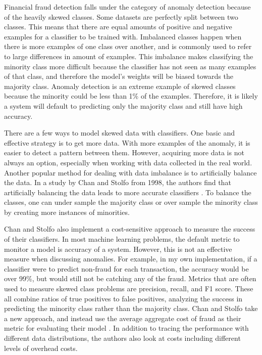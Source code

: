 \documentclass[midd]{thesis}
\begin{document}
Financial fraud detection falls under the category of anomaly detection because of the heavily skewed classes. Some datasets are perfectly split between two classes. This means that there are equal amounts of positive and negative examples for a classifier to be trained with. Imbalanced classes happen when there is more examples of one class over another, and is commonly used to refer to large differences in amount of examples. This imbalance makes classifying the minority class more difficult because the classifier has not seen as many examples of that class, and therefore the model's weights will be biased towards the majority class. Anomaly detection is an extreme example of skewed classes because the minority could be less than 1\% of the examples. Therefore, it is likely a system will default to predicting only the majority class and still have high accuracy.

There are a few ways to model skewed data with classifiers. One basic and effective strategy is to get more data. With more examples of the anomaly, it is easier to detect a pattern between them. However, acquiring more data is not always an option, especially when working with data collected in the real world. Another popular method for dealing with data imbalance is to artificially balance the data.  In a study by Chan and Stolfo from 1998, the authors find that artificially balancing the data leads to more accurate classifiers \cite{Chan}. To balance the classes, one can under sample the majority class or over sample the minority class by creating more instances of minorities.


Chan and Stolfo also implement a cost-sensitive approach to measure the success of their classifiers. In most machine learning problems, the default metric to monitor a model is accuracy of a system. However, this is not an effective measure when discussing anomalies. For example, in my own implementation, if a classifier were to predict non-fraud for each transaction, the accuracy would be over 99\%, but would still not be catching any of the fraud. Metrics that are often used to measure skewed class problems are precision, recall, and F1 score. These all combine ratios of true positives to false positives, analyzing the success in predicting the minority class rather than the majority class. Chan and Stolfo take a new approach, and instead use the average aggregate cost of fraud as their metric for evaluating their model \cite{Chan}. In addition to tracing the performance with different data distributions, the authors also look at costs including different levels of overhead costs.  
\end{document}
